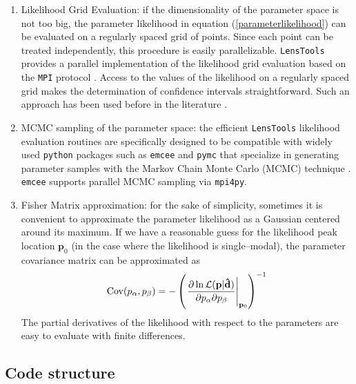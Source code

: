 \documentclass[5p]{elsarticle}
\newcommand{\bb}[1]{\mathbf{#1}}
\newcommand{\bbh}[1]{\mathbf{\hat{#1}}}
\newcommand{\ttt}[1]{\texttt{#1}}
\newcommand{\LT}{\texttt{LensTools} }
\begin{document}
\begin{enumerate}

\item Likelihood Grid Evaluation: if the dimensionality of the parameter space is not too big, the parameter likelihood in equation (\ref{parameterlikelihood}) can be evaluated on a regularly spaced grid of points. Since each point can be treated independently, this procedure is easily parallelizable. \LT provides a parallel implementation of the likelihood grid evaluation based on the \ttt{MPI} protocol \citep{MPI}. Access to the values of the likelihood on a regularly spaced grid makes the determination of confidence intervals straightforward. Such an approach has been used before in the literature \citep{cfhtpeaks,cfhtmink}.    

\item MCMC sampling of the parameter space: the efficient \LT likelihood evaluation routines are specifically designed to be compatible with widely used \ttt{python} packages such as \ttt{emcee} \citep{emcee} and \ttt{pymc} \citep{pymc} that specialize in generating parameter samples with the Markov Chain Monte Carlo (MCMC) technique \citep{mcmc}. \ttt{emcee} supports parallel MCMC sampling via \ttt{mpi4py}.    

\item Fisher Matrix approximation: for the sake of simplicity, sometimes it is convenient to approximate the parameter likelihood as a Gaussian centered around its maximum. If we have a reasonable guess for the likelihood peak location $\bb{p}_0$ (in the case where the likelihood is single--modal), the parameter covariance matrix can be approximated as 
\begin{equation}
{\rm Cov}(p_\alpha,p_\beta) = -\left(\left.\frac{\partial\ln\mathcal{L}(\bb{p}\vert\bbh{d})}{\partial p_\alpha\partial p_\beta}\right\vert_{\bb{p}_0}\right)^{-1}
\end{equation}
%
The partial derivatives of the likelihood with respect to the parameters are easy to evaluate with finite differences. 
\end{enumerate}

\subsection{Code structure}
\end{document}
